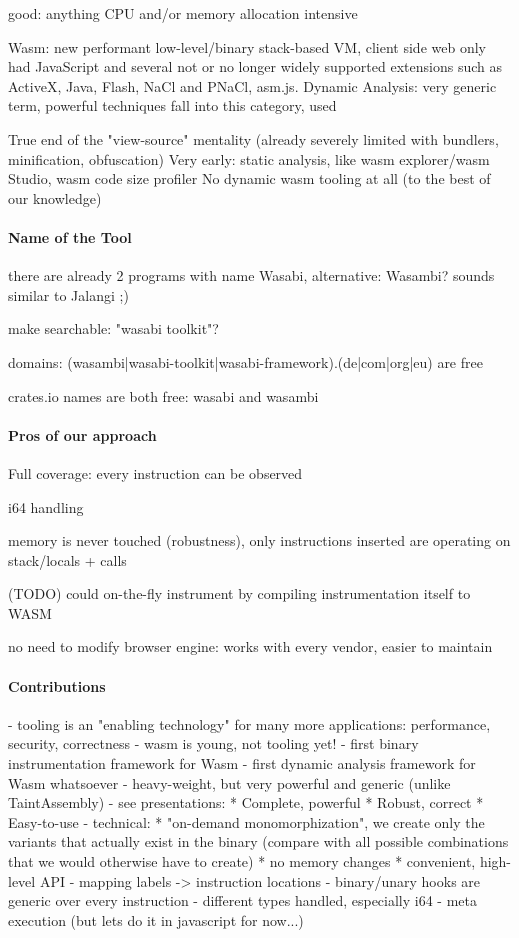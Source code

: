 \documentclass[sigplan,review,anonymous]{acmart}\settopmatter{printfolios=true,printccs=false,printacmref=false}
\begin{document}
 good: anything CPU and/or memory allocation intensive


Wasm: new performant low-level/binary stack-based VM, client side web only had JavaScript and several not or no longer widely supported extensions such as ActiveX, Java, Flash, NaCl and PNaCl, asm.js.
Dynamic Analysis: very generic term, powerful techniques fall into this category, used 

True end of the "view-source" mentality (already severely limited with bundlers, minification, obfuscation)
Very early: static analysis, like wasm explorer/wasm Studio, wasm code size profiler
No dynamic wasm tooling at all (to the best of our knowledge)




\paragraph{Name of the Tool}
there are already 2 programs with name Wasabi, alternative: Wasambi?  sounds similar to Jalangi ;)

make searchable: "wasabi toolkit"?

domains: (wasambi|wasabi-toolkit|wasabi-framework).(de|com|org|eu) are free

crates.io names are both free: wasabi and wasambi


\paragraph{Pros of our approach}
Full coverage: every instruction can be observed

i64 handling

memory is never touched (\textrightarrow robustness), only instructions inserted are operating on stack/locals + calls

(TODO) could on-the-fly instrument by compiling instrumentation itself to WASM

no need to modify browser engine: works with every vendor, easier to maintain

\paragraph{Contributions}

- tooling is an "enabling technology" for many more applications: performance, security, correctness
- wasm is young, not tooling yet!
- first binary instrumentation framework for Wasm
- first dynamic analysis framework for Wasm whatsoever
- heavy-weight, but very powerful and generic (unlike TaintAssembly)
- see presentations:
	* Complete, powerful
	* Robust, correct
	* Easy-to-use
- technical: 
	* "on-demand monomorphization", we create only the variants that actually exist in the binary (compare with all possible combinations that we would otherwise have to create)
	* no memory changes
	* convenient, high-level API
		- mapping labels -> instruction locations
		- binary/unary hooks are generic over every instruction
		- different types handled, especially i64
- meta execution (but lets do it in javascript for now...)
		
\end{document}

